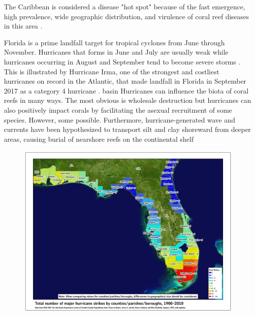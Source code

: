 \documentclass[12pt ,a4paper]{article}
\begin{document}
The Caribbean is considered a disease "hot spot" because of the fast emergence, high prevalence, wide geographic distribution, and virulence of coral reef diseases in this area \citep{green2000significance, harvell2007coral}. 

Florida is a prime landfall target for tropical cyclones from June through November. Hurricanes that forms in June and July are usually weak while hurricanes occurring in August and September tend to become severe storms \citep{banks2008reef}. This is illustrated by Hurricane Irma, one of the strongest and costliest hurricanes on record in the Atlantic, that made landfall in Florida in September 2017 as a category 4 hurricane \citep{irmaNOAA, xian2018brief}. basin Hurricanes can influence the biota of coral reefs in many ways. The most obvious is wholesale destruction but hurricanes can also positively impact corals by facilitating the asexual recruitment of some species. However, some possible. Furthermore, hurricane-generated wave and currents have been hypothesized to transport silt and clay shoreward from deeper areas, causing burial of nearshore reefs on the continental shelf \citep{miller2008effects}

\begin{figure}
    \centering
    \includegraphics[width=\textwidth]{figures/hurricane_strikes.jpg}
    \caption{}
    \label{inro:landfall}
\end{figure}



 

\end{document}
